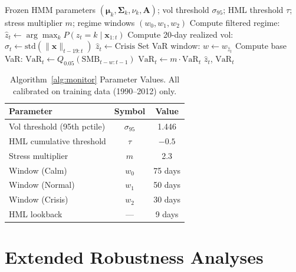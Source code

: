 \documentclass[sigconf,anonymous]{acmart}
\begin{document}
\begin{algorithm}[t]
\caption{Real-Time Factor Risk Monitor}
\label{alg:monitor}
\begin{algorithmic}[1]
\REQUIRE Frozen HMM parameters $(\boldsymbol{\mu}_k, \boldsymbol{\Sigma}_k, \nu_k, \mathbf{A})$;
vol threshold $\sigma_{95}$; HML threshold $\tau$; stress multiplier $m$;
regime windows $(w_0, w_1, w_2)$
  \STATE Compute filtered regime: $\hat{z}_t \gets \arg\max_k P(z_t=k \mid \mathbf{x}_{1:t})$
  \STATE Compute 20-day realized vol: $\hat{\sigma}_t \gets \text{std}(\|\mathbf{x}\|_{t-19:t})$
    \STATE $\hat{z}_t \gets \text{Crisis}$ 
  \ENDIF
  \STATE Set VaR window: $w \gets w_{\hat{z}_t}$
  \STATE Compute base VaR: $\text{VaR}_t \gets Q_{0.05}(\text{SMB}_{t-w:t-1})$
    \STATE $\text{VaR}_t \gets m \cdot \text{VaR}_t$ 
  \ENDIF
  \RETURN $\hat{z}_t$, $\text{VaR}_t$
\ENDFOR
\end{algorithmic}
\end{algorithm}

\begin{table}[t]
\centering
\caption{Algorithm~\ref{alg:monitor} Parameter Values. All calibrated on
training data (1990--2012) only.}
\label{tab:algo_params}
\small
\begin{tabular}{lcc}
\toprule
Parameter & Symbol & Value \\
\midrule
Vol threshold (95th pctile) & $\sigma_{95}$ & 1.446 \\
HML cumulative threshold & $\tau$ & $-0.5$ \\
Stress multiplier & $m$ & 2.3 \\
Window (Calm) & $w_0$ & 75 days \\
Window (Normal) & $w_1$ & 50 days \\
Window (Crisis) & $w_2$ & 30 days \\
HML lookback & --- & 9 days \\
\bottomrule
\end{tabular}
\end{table}

\section{Extended Robustness Analyses}
\label{app:robustness}
\end{document}

